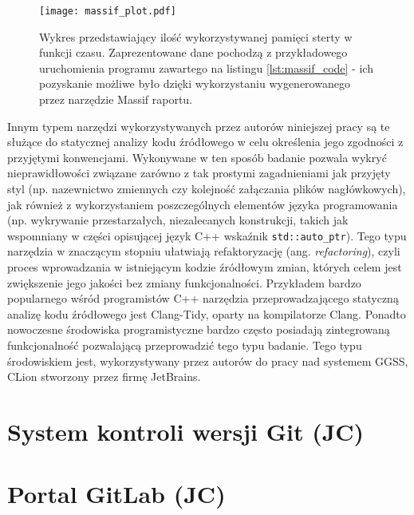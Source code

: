\begin{figure}[H]
\centering
\texttt{[image: massif\_plot.pdf]}
\caption{Wykres przedstawiający ilość wykorzystywanej pamięci sterty w funkcji czasu. Zaprezentowane dane pochodzą z przykładowego uruchomienia programu zawartego na listingu \ref{lst:massif_code} - ich pozyskanie możliwe było dzięki wykorzystaniu wygenerowanego przez narzędzie Massif raportu.}
\label{fig:massif_plot}
\end{figure}

Innym typem narzędzi wykorzystywanych przez autorów niniejszej pracy są te służące do statycznej analizy kodu źródłowego w celu określenia jego zgodności z przyjętymi konwencjami. Wykonywane w ten sposób badanie pozwala wykryć nieprawidłowości związane zarówno z tak prostymi zagadnieniami jak przyjęty styl (np. nazewnictwo zmiennych czy kolejność załączania plików nagłówkowych), jak również z wykorzystaniem poszczególnych elementów języka programowania (np. wykrywanie przestarzałych, niezalecanych konstrukcji, takich jak wspomniany w części opisującej język C++ wskaźnik \lstinline{std::auto_ptr}). Tego typu narzędzia w znaczącym stopniu ułatwiają refaktoryzację (ang. \emph{refactoring}), czyli proces wprowadzania w istniejącym kodzie źródłowym zmian, których celem jest zwiększenie jego jakości bez zmiany funkcjonalności. Przykładem bardzo popularnego wśród programistów C++ narzędzia przeprowadzającego statyczną analizę kodu źródłowego jest Clang-Tidy, oparty na kompilatorze Clang. Ponadto nowoczesne środowiska programistyczne bardzo często posiadają zintegrowaną funkcjonalność pozwalającą przeprowadzić tego typu badanie. Tego typu środowiskiem jest, wykorzystywany przez autorów do pracy nad systemem GGSS, CLion stworzony przez firmę JetBrains.


\section{System kontroli wersji Git (JC)} %
\section{Portal GitLab (JC)}

